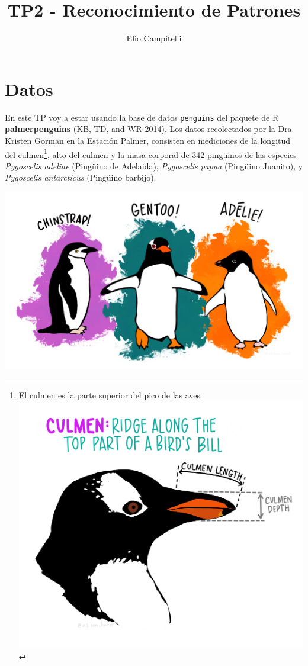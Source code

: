 \documentclass[]{tufte-handout}
\title{TP2 - Reconocimiento de Patrones}
\author{Elio Campitelli}
\date{}
\begin{document}
\maketitle



{
\setcounter{tocdepth}{2}
\tableofcontents
}

\hypertarget{datos}{%
\section{Datos}\label{datos}}

En este TP voy a estar usando la base de datos \texttt{penguins} del paquete de R \textbf{palmerpenguins} (KB, TD, and WR 2014). Los datos recolectados por la Dra. Kristen Gorman en la Estación Palmer, consisten en mediciones de la longitud del culmen\footnote{El culmen es la parte superior del pico de las aves \includegraphics{culmen_depth.png}}, alto del culmen y la masa corporal de 342 pingüinos de las especies \emph{Pygoscelis adeliae} (Pingüino de Adelaida), \emph{Pygoscelis papua} (Pingüino Juanito), y \emph{Pygoscelis antarcticus} (Pingüino barbijo).

\begin{center}\includegraphics[width=0.8\linewidth]{penguins} \end{center}
\end{document}
